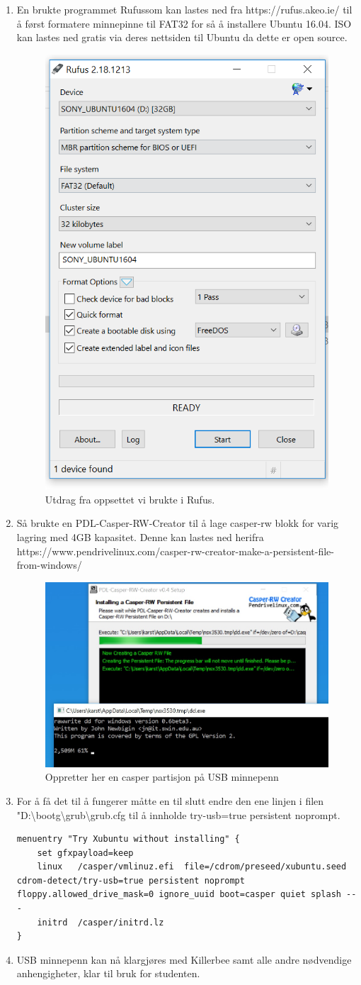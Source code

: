 \documentclass{article}
\begin{document}
\begin{appendices}
\begin{enumerate}
\item En brukte programmet Rufussom kan lastes ned fra https://rufus.akeo.ie/ til å først formatere minnepinne til FAT32 for så å installere Ubuntu 16.04. ISO kan lastes ned gratis via deres nettsiden til Ubuntu da dette er open source. 
\begin{figure} [!ht]
	\centering
		\includegraphics[width=0.3\linewidth]{rufus} 
\caption{Utdrag fra oppsettet vi brukte i Rufus.}
\end{figure}

\item Så brukte en PDL-Casper-RW-Creator til å lage casper-rw blokk for varig lagring med 4GB kapasitet. Denne kan lastes ned herifra https://www.pendrivelinux.com/casper-rw-creator-make-a-persistent-file-from-windows/
\begin{figure} [!ht]
	\centering
		\includegraphics[width=0.5\linewidth]{casper} 
\caption{Oppretter her en casper partisjon på USB minnepenn}
\end{figure}

\item For å få det til å fungerer måtte en til  slutt endre den ene linjen i filen  "D:\textbackslash{boot}g\textbackslash{grub}\textbackslash{grub.cfg} til å innholde try-usb=true persistent noprompt.
\begin{lstlisting}[language=Comsol]
menuentry "Try Xubuntu without installing" {
	set gfxpayload=keep
	linux	/casper/vmlinuz.efi  file=/cdrom/preseed/xubuntu.seed cdrom-detect/try-usb=true persistent noprompt floppy.allowed_drive_mask=0 ignore_uuid boot=casper quiet splash ---
	initrd	/casper/initrd.lz
}
\end{lstlisting}
\item USB minnepenn kan nå klargjøres med Killerbee samt alle andre nødvendige anhengigheter, klar til bruk for studenten.
\end{enumerate}


\end{appendices}
\end{document}

